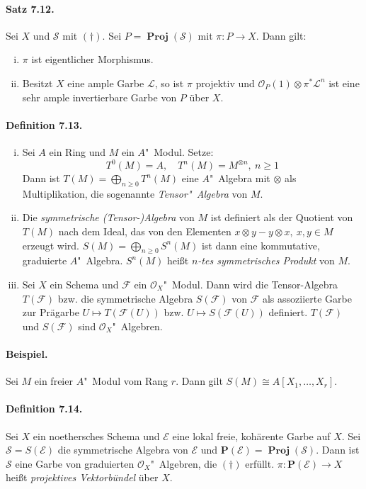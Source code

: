 \paragraph{Satz 7.12.}\label{7.12} Sei $X$ und $\mathcal{S}$ mit $(\dagger)$. Sei $P=\operatorname{\mathbf{Proj}}(\mathcal{S})$ mit $\pi:P\to X$. Dann gilt:
\begin{enumerate}[(i)]
\item $\pi$ ist eigentlicher Morphismus.
\item Besitzt $X$ eine ample Garbe $\mathcal{L}$, so ist $\pi$ projektiv und $\mathcal{O}_P(1)\otimes\pi^\ast\mathcal{L}^n$ ist eine sehr ample invertierbare Garbe von $P$ über $X$.
\end{enumerate}

\paragraph{Definition 7.13.}\label{7.13} \begin{enumerate}[(i)]
\item Sei $A$ ein Ring und $M$ ein $A$"~Modul. Setze:
\[T^0(M)=A,\quad T^n(M)= M^{\otimes n},\ n\geq 1 \]
Dann ist $T(M)=\bigoplus_{n\geq 0}T^n(M)$ eine $A$"~Algebra mit $\otimes$ als Multiplikation, die sogenannte \textit{Tensor"~Algebra} von $M$.
\item Die \textit{symmetrische (Tensor-)Algebra} von $M$ ist definiert als der Quotient von $T(M)$ nach dem Ideal, das von den Elementen $x\otimes y-y\otimes x,\ x,y\in M$ erzeugt wird. $S(M)=\bigoplus_{n\geq 0}S^n(M)$ ist dann eine kommutative, graduierte $A$"~Algebra. $S^n(M)$ heißt \textit{$n$-tes symmetrisches Produkt} von $M$.
\item Sei $X$ ein Schema und $\mathcal{F}$ ein $\mathcal{O}_X$"~Modul. Dann wird die Tensor-Algebra $T(\mathcal{F})$ bzw. die symmetrische Algebra $S(\mathcal{F})$ von $\mathcal{F}$ als assoziierte Garbe zur Prägarbe $U\mapsto T(\mathcal{F}(U))$ bzw. $U\mapsto S(\mathcal{F}(U))$ definiert. $T(\mathcal{F})$ und $S(\mathcal{F})$ sind $\mathcal{O}_X$"~Algebren.
\end{enumerate}

\paragraph{Beispiel.} Sei $M$ ein freier $A$"~Modul vom Rang $r$. Dann gilt $S(M)\cong A[X_1,\ldots,X_r]$.

\paragraph{Definition 7.14.}\label{7.14} Sei $X$ ein noethersches Schema und $\mathcal{E}$ eine lokal freie, kohärente Garbe auf $X$. Sei $\mathcal{S}=S(\mathcal{E})$ die symmetrische Algebra von $\mathcal{E}$ und $\mathbf{P}(\mathcal{E})=\operatorname{\mathbf{Proj}}(\mathcal{S})$. Dann ist $\mathcal{S}$ eine Garbe von graduierten $\mathcal{O}_X$"~Algebren, die $(\dagger)$ erfüllt. $\pi:\mathbf{P}(\mathcal{E})\to X$ heißt \textit{projektives Vektorbündel} über $X$.

